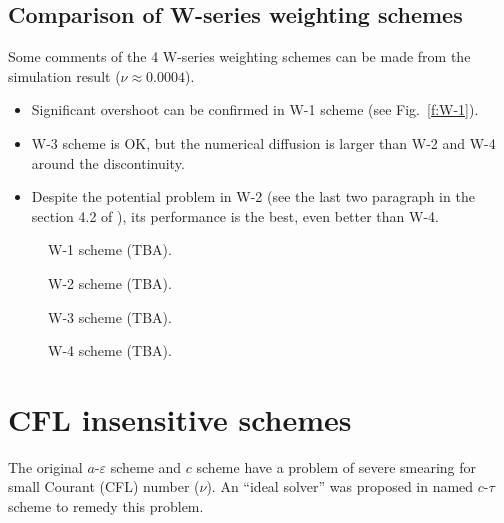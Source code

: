 \documentclass[11pt,dvips]{article}
\renewcommand{\figurename}{Fig.}
\numberwithin{equation}{section}
\begin{document}
\subsection{Comparison of W-series weighting schemes}

Some comments of the 4 W-series weighting schemes can be made from the
simulation result ($\nu\approx0.0004$).
\begin{itemize}
  \item Significant overshoot can be
        confirmed\cite{chang_multi-dimensional_2003} in W-1 scheme (see
        \figurename~\ref{f:W-1}).
  \item W-3 scheme is OK, but the numerical diffusion is larger than W-2 and
        W-4 around the discontinuity.
  \item Despite the potential problem in W-2 (see the last two paragraph in the
        section 4.2 of \cite{chang_multi-dimensional_2003}), its performance is
        the best, even better than W-4.
\end{itemize}

\begin{figure}[htbp]
  \centering
  \caption{W-1 scheme (TBA).}
  \label{f:W-1}
  \caption{W-2 scheme (TBA).}
  \label{f:W-2}
\end{figure}

\begin{figure}[htbp]
  \centering
  \caption{W-3 scheme (TBA).}
  \label{f:W-3}
  \caption{W-4 scheme (TBA).}
  \label{f:W-4}
\end{figure}

\section{CFL insensitive schemes}
\label{s:ctau}

The original $a$-$\varepsilon$ scheme and $c$ scheme have a problem of severe
smearing for small Courant (CFL) number ($\nu$).  An ``ideal solver'' was
proposed in \cite{chang_multi-dimensional_2003} named $c$-$\tau$ scheme to
remedy this problem.
\end{document}
